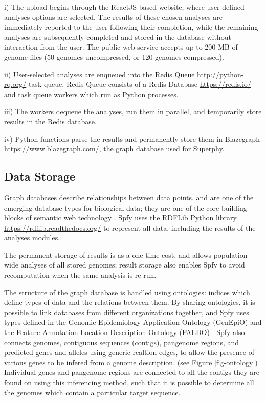 \documentclass[a4,center,fleqn]{NAR}
\begin{document}
i) The upload begins through the ReactJS-based website, where user-defined analyses options are selected. The results of these chosen analyses are immediately reported to the user following their completion, while the remaining analyses are subsequently completed and stored in the database without interaction from the user. The public web service accepts up to 200 MB of genome files (50 genomes uncompressed, or 120 genomes compressed).

ii) User-selected analyses are enqueued into the Redis Queue \url{http://python-rq.org/} task queue. Redis Queue consists of a Redis Database \url{https://redis.io/} and task queue workers which run as Python processes.

iii) The workers dequeue the analyses, run them in parallel, and temporarily store results in the Redis database.

iv) Python functions parse the results and permanently store them in Blazegraph \url{https://www.blazegraph.com/}, the graph database used for Superphy.

\subsection{Data Storage}
Graph databases describe relationships between data points, and are one of the emerging \cite{de2015trends} database types for biological data; they are one of the core building blocks of semantic web technology \cite{horrocks2005semantic}.
Spfy uses the RDFLib Python library \url{https://rdflib.readthedocs.org/} to represent all data, including the results of the analyses modules.

The permanent storage of results is as a one-time cost, and allows population-wide analyses of all stored genomes; result storage also enables Spfy to avoid recomputation when the same analysis is re-run.

The structure of the graph database is handled using ontologies: indices which define types of data and the relations between them.
By sharing ontologies, it is possible to link databases from different organizations together, and Spfy uses types defined in the  Genomic Epidemiology Application Ontology (GenEpiO) \cite{griffiths2017context} and the Feature Annotation Location Description Ontology (FALDO) \cite{bolleman2016faldo}.
Spfy also connects genomes, contiguous sequences (contigs), pangenome regions, and predicted genes and alleles using generic realtion edges, to allow the presence of various genes to be infered from a genome description.
(see Figure \ref{fig-ontology})
Individual genes and pangenome regions are connected to all the contigs they are found on using this inferencing method, such that it is possible to determine all the genomes which contain a particular target sequence.
\end{document}
